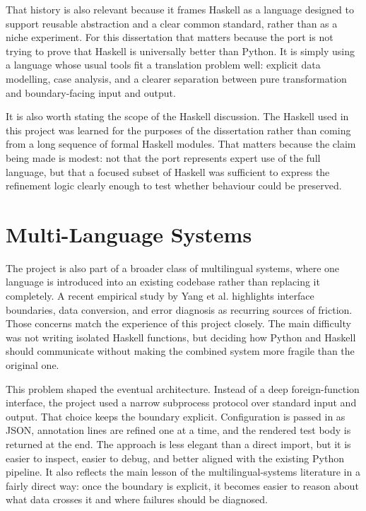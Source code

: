 That history is also relevant because it frames Haskell as a language
designed to support reusable abstraction and a clear common standard,
rather than as a niche experiment. For this dissertation that matters
because the port is not trying to prove that Haskell is universally
better than Python. It is simply using a language whose usual tools
fit a translation problem well: explicit data modelling, case
analysis, and a clearer separation between pure transformation and
boundary-facing input and output.

It is also worth stating the scope of the Haskell discussion. The
Haskell used in this project was learned for the purposes of the
dissertation rather than coming from a long sequence of formal
Haskell modules. That matters because the claim being made is modest:
not that the port represents expert use of the full language, but that
a focused subset of Haskell was sufficient to express the refinement
logic clearly enough to test whether behaviour could be preserved.



\section{Multi-Language Systems}

The project is also part of a broader class of multilingual systems,
where one language is introduced into an existing codebase rather than
replacing it completely. A recent empirical study by Yang et al.
\citep{yang2024multilanguage} highlights interface boundaries, data
conversion, and error diagnosis as recurring sources of friction.
Those concerns match the experience of this project closely. The main
difficulty was not writing isolated Haskell functions, but deciding
how Python and Haskell should communicate without making the combined
system more fragile than the original one.

This problem shaped the eventual architecture. Instead of a deep
foreign-function interface, the project used a narrow subprocess
protocol over standard input and output. That choice keeps the
boundary explicit. Configuration is passed in as JSON, annotation
lines are refined one at a time, and the rendered test body is
returned at the end. The approach is less elegant than a direct
import, but it is easier to inspect, easier to debug, and better
aligned with the existing Python pipeline. It also reflects the main
lesson of the multilingual-systems literature in a fairly direct way:
once the boundary is explicit, it becomes easier to reason about what
data crosses it and where failures should be diagnosed.

